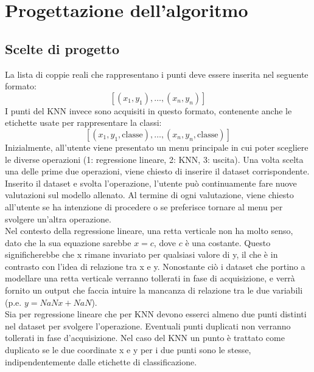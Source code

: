 \documentclass[11pt]{article}
\theoremstyle{definition}
\begin{document}
\newpage

\section{Progettazione dell'algoritmo}

\subsection{Scelte di progetto}
La lista di coppie reali che rappresentano i punti deve essere inserita nel seguente formato:
$$
[(x_1, y_1), \dots, (x_n, y_n)]
$$
I punti del KNN invece sono acquisiti in questo formato, contenente anche le etichette usate per rappresentare la classi:
$$
[(x_1, y_1, \text{classe}), \dots, (x_n, y_n, \text{classe})]
$$
Inizialmente, all'utente viene presentato un menu principale in cui poter scegliere le diverse operazioni (1: regressione lineare, 2: KNN, 3: uscita). Una volta scelta una delle prime due operazioni, viene chiesto di inserire il dataset corrispondente. Inserito il dataset e svolta l'operazione, l'utente può continuamente fare nuove valutazioni sul modello allenato. Al termine di ogni valutazione, viene chiesto all'utente se ha intenzione di procedere o se preferisce tornare al menu per svolgere un'altra operazione. \\
\newline
Nel contesto della regressione lineare, una retta verticale non ha molto senso, dato che la sua equazione sarebbe $x=c$, dove $c$ è una costante. Questo significherebbe che x rimane invariato per qualsiasi valore di y, il che è in contrasto con l'idea di relazione tra x e y. Nonostante ciò i dataset che portino a modellare una retta verticale verranno tollerati in fase di acquisizione, e verrà fornito un output che faccia intuire la mancanza di relazione tra le due variabili (p.e. $y=NaNx+NaN$). \\
\newline
Sia per regressione lineare che per KNN devono esserci almeno due punti distinti nel dataset per svolgere l'operazione. Eventuali punti duplicati non verranno tollerati in fase d'acquisizione. Nel caso del KNN un punto è trattato come duplicato se le due coordinate x e y per i due punti sono le stesse, indipendentemente dalle etichette di classificazione.
\end{document}
